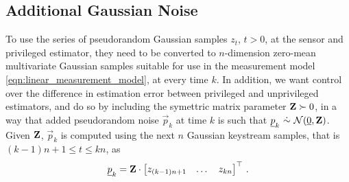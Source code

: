 \documentclass[letterpaper, 10 pt, conference]{IEEEtran}
\theoremstyle{definition}
\begin{document}
\subsection{Additional Gaussian Noise}\label{subsec:adding_privilege_noise}
To use the series of pseudorandom Gaussian samples $z_t$, $t>0$, at the sensor and privileged estimator, they need to be converted to $n$-dimension zero-mean multivariate Gaussian samples suitable for use in the measurement model \eqref{eqn:linear_measurement_model}, at every time $k$. In addition, we want control over the difference in estimation error between privileged and unprivileged estimators, and do so by including the symettric matrix parameter ${{\mathbf{Z}}}\succ 0$, in a way that added pseudorandom noise $\vec{p}_k$ at time $k$ is such that $\vec{p}_k\ \dot{\sim}\ \mathcal{N}(\vec{0},\mat{Z})$. Given ${{\mathbf{Z}}}$, $\vec{p}_k$ is computed using the next $n$ Gaussian keystream samples, that is $(k-1)n+1\leq t\leq kn$, as
\begin{equation}
   {\underline{p}}_k = {{\mathbf{Z}}}\cdot
   \begin{bmatrix}
      z_{(k-1)n+1} & \dots & z_{kn}
   \end{bmatrix}^\top\,.
\end{equation}
\end{document}
